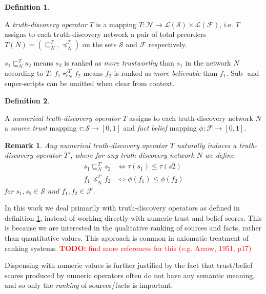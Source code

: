 \documentclass{article}
\theoremstyle{definition} \newtheorem{definition}{Definition}
\theoremstyle{definition} \newtheorem{example}{Example}
\theoremstyle{plain} \newtheorem{axiom}{Axiom}
\theoremstyle{plain} \newtheorem*{remark}{Remark}
\theoremstyle{remark} \newtheorem*{notation}{Notation}
\theoremstyle{plain} \newtheorem{lemma}{Lemma}
\theoremstyle{plain} \newtheorem{proposition}{Proposition}
\newcommand{\todo}[1] {
    \textcolor{red}{
        \textbf{TODO:} #1
    }
}
\renewcommand{\S}{\mathcal{S}}  %
\newcommand{\F}{\mathcal{F}}
\newcommand{\sle}{\sqsubseteq}
\newcommand{\fle}{\preceq}
\newcommand{\orderings}{\mathcal{L}}
\begin{document}
\begin{definition}
\label{def:truth_discovery_operator}

A \emph{truth-discovery operator} $T$ is a mapping $T: \mathcal{N} \rightarrow
\orderings(\S) \times \orderings(\F)$, i.e. $T$ assigns to each truth-discovery
network a pair of total preorders $T(N) = (\sle_N^T, \fle_N^T)$ on the sets
$\S$ and $\F$ respectively.

$s_1 \sle_N^T s_2$ means $s_2$ is ranked as \emph{more trustworthy} than $s_1$
in the network $N$ according to $T$; $f_1 \fle_N^T f_2$ means $f_2$ is ranked
as \emph{more believable} than $f_1$. Sub- and super-scripts can be omitted
when clear from context.

\end{definition}

\begin{definition}
\label{def:numerical}

A \emph{numerical truth-discovery operator} $T$ assigns to each
truth-discovery network $N$ a \emph{source trust} mapping $\tau: \S \rightarrow
[0, 1]$ and \emph{fact belief} mapping $\phi: \F \rightarrow [0, 1]$.

\end{definition}

\begin{remark}
    Any numerical truth-discovery operator $T$ naturally induces a
    truth-discovery operator $T'$, where for any truth-discovery network $N$
    we define
    \begin{align*}
    s_1 \sle_N^{T'} s_2 & \iff \tau(s_1) \le \tau(s2) \\
    f_1 \fle_N^{T'} f_2 & \iff \phi(f_1) \le \phi(f_2)
    \end{align*}
    for $s_1, s_2 \in \S$ and $f_1, f_2 \in \F$.
\end{remark}

In this work we deal primarily with truth-discovery operators as defined in
definition \ref{def:truth_discovery_operator}, instead of working directly
with numeric trust and belief scores. This is because we are interested in the
qualitative ranking of sources and facts, rather than quantitative values. This
approach is common in axiomatic treatment of ranking
systems{\cite{altman,altman_personalised}}. \todo{find more references for this
(e.g. Arrow, 1951, p17)}

Dispensing with numeric values is further justified by the fact that
trust/belief scores produced by numeric operators often do not have any
semantic meaning\cite{pasternack}, and so only the \emph{ranking} of
sources/facts is important.
\end{document}
